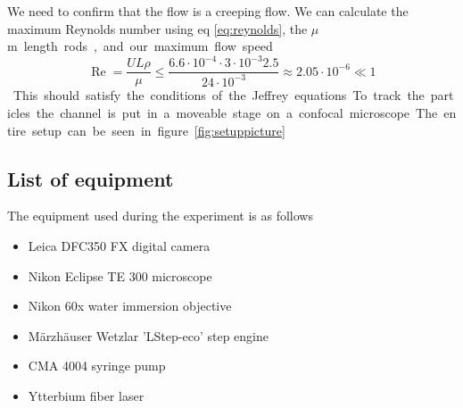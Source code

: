We need to confirm that the flow is a creeping flow. We can calculate the maximum Reynolds number using eq \ref{eq:reynolds}, the \unit[3]{$\mu$m} length rods, and our maximum flow speed.

\begin{equation}
\operatorname{Re} = \frac{U L \rho}{\mu} 
\leq \frac{6.6\cdot 10^{-4} \cdot 3 \cdot 10^{-3} 2.5 }{24 \cdot 10^{-3}} 
\approx	 	2.05  \cdot 10^{-6} \ll 1
\end{equation}

This should satisfy the conditions of the Jeffrey equations. To track the particles the channel is put in a moveable stage on a confocal microscope. The entire setup can be seen in figure \ref{fig:setuppicture}



\subsection{List of equipment}
 The equipment used during the experiment is as follows
\begin{itemize}
\item Leica DFC350 FX digital camera 
\item Nikon Eclipse TE 300 microscope
\item Nikon 60x water immersion objective
\item Märzhäuser Wetzlar 'LStep-eco' step engine
\item CMA 4004 syringe pump
\item Ytterbium fiber laser  %
\end{itemize}

%
%
	